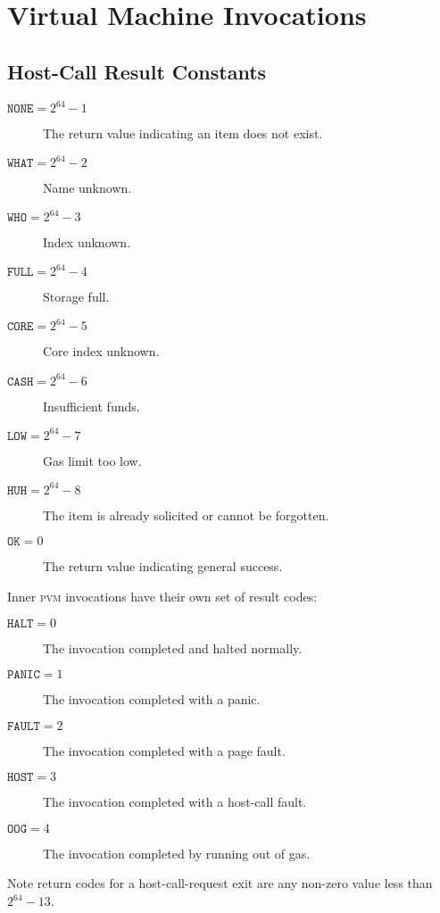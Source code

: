 \section{Virtual Machine Invocations}\label{sec:virtualmachineinvocations}



\newcommand*{\pvm}{\mathbf{M}}
\newcommand*{\segoff}{\varsigma}

\subsection{Host-Call Result Constants}

\begin{description}
  \item[$\mathtt{NONE} = 2^{64} - 1$] The return value indicating an item does not exist.
  \item[$\mathtt{WHAT} = 2^{64} - 2$] Name unknown.
  \item[$\mathtt{WHO} = 2^{64} - 3$] Index unknown.
  \item[$\mathtt{FULL} = 2^{64} - 4$] Storage full.
  \item[$\mathtt{CORE} = 2^{64} - 5$] Core index unknown.
  \item[$\mathtt{CASH} = 2^{64} - 6$] Insufficient funds.
  \item[$\mathtt{LOW} = 2^{64} - 7$] Gas limit too low.
  \item[$\mathtt{HUH} = 2^{64} - 8$] The item is already solicited or cannot be forgotten.
  \item[$\mathtt{OK} = 0$] The return value indicating general success.
\end{description}

Inner \textsc{pvm} invocations have their own set of result codes:
\begin{description}
  \item[$\mathtt{HALT} = 0$] The invocation completed and halted normally.
  \item[$\mathtt{PANIC} = 1$] The invocation completed with a panic.
  \item[$\mathtt{FAULT} = 2$] The invocation completed with a page fault.
  \item[$\mathtt{HOST} = 3$] The invocation completed with a host-call fault.
  \item[$\mathtt{OOG} = 4$] The invocation completed by running out of gas.
\end{description}

Note return codes for a host-call-request exit are any non-zero value less than $2^{64} - 13$.

